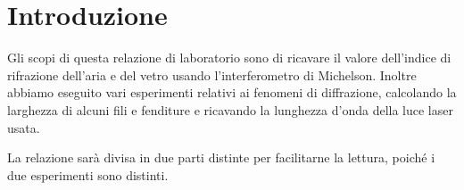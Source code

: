 \section{Introduzione}

Gli scopi di questa relazione di laboratorio sono di ricavare il valore dell'indice di rifrazione dell'aria e del vetro usando
l'interferometro di Michelson. Inoltre abbiamo eseguito vari esperimenti relativi ai fenomeni di diffrazione, calcolando la larghezza di alcuni fili e fenditure e ricavando la lunghezza d'onda della luce laser usata.

La relazione sarà divisa in due parti distinte per facilitarne la lettura, poiché i due esperimenti sono distinti.
